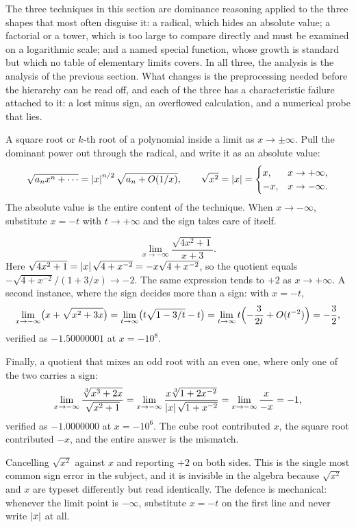 The three techniques in this section are dominance reasoning applied to the three shapes that most often disguise it: a radical, which hides an absolute value; a factorial or a tower, which is too large to compare directly and must be examined on a logarithmic scale; and a named special function, whose growth is standard but which no table of elementary limits covers. In all three, the analysis is the analysis of the previous section. What changes is the preprocessing needed before the hierarchy can be read off, and each of the three has a characteristic failure attached to it: a lost minus sign, an overflowed calculation, and a numerical probe that lies.

\cue A square root or $k$-th root of a polynomial inside a limit as $x\to\pm\infty$.
\method Pull the dominant power out through the radical, and write it as an absolute value:
\[
\sqrt{a_nx^{n}+\cdots}=\left\lvert x\right\rvert^{n/2}\sqrt{a_n+O(1/x)},\qquad \sqrt{x^{2}}=\left\lvert x\right\rvert=\begin{cases}x,&x\to+\infty,\\ -x,&x\to-\infty.\end{cases}
\]
The absolute value is the entire content of the technique. When $x\to-\infty$, substitute $x=-t$ with $t\to+\infty$ and the sign takes care of itself.

\begin{worked}
\[
\lim_{x\to-\infty}\frac{\sqrt{4x^{2}+1}}{x+3}.
\]
Here $\sqrt{4x^{2}+1}=\left\lvert x\right\rvert\sqrt{4+x^{-2}}=-x\sqrt{4+x^{-2}}$, so the quotient equals $-\sqrt{4+x^{-2}}\big/(1+3/x)\to-2$. The same expression tends to $+2$ as $x\to+\infty$. A second instance, where the sign decides more than a sign: with $x=-t$,
\[
\lim_{x\to-\infty}\bigl(x+\sqrt{x^{2}+3x}\bigr)=\lim_{t\to\infty}\bigl(t\sqrt{1-3/t}-t\bigr)=\lim_{t\to\infty}t\Bigl(-\frac{3}{2t}+O(t^{-2})\Bigr)=-\frac32 ,
\]
verified as $-1.50000001$ at $x=-10^{8}$.

Finally, a quotient that mixes an odd root with an even one, where only one of the two carries a sign:
\[
\lim_{x\to-\infty}\frac{\sqrt[3]{x^{3}+2x}}{\sqrt{x^{2}+1}}
=\lim_{x\to-\infty}\frac{x\sqrt[3]{1+2x^{-2}}}{\left\lvert x\right\rvert\sqrt{1+x^{-2}}}
=\lim_{x\to-\infty}\frac{x}{-x}=-1 ,
\]
verified as $-1.0000000$ at $x=-10^{6}$. The cube root contributed $x$, the square root contributed $-x$, and the entire answer is the mismatch.
\end{worked}

\begin{trap}
Cancelling $\sqrt{x^{2}}$ against $x$ and reporting $+2$ on both sides. This is the single most common sign error in the subject, and it is invisible in the algebra because $\sqrt{x^{2}}$ and $x$ are typeset differently but read identically. The defence is mechanical: whenever the limit point is $-\infty$, substitute $x=-t$ on the first line and never write $\left\lvert x\right\rvert$ at all.
\end{trap}

